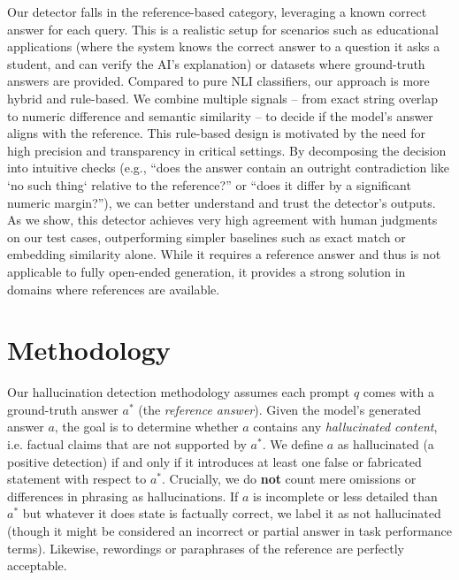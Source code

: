 \documentclass{article}
\begin{document}
Our detector falls in the reference-based category, leveraging a known correct answer for each query. This is a realistic setup for scenarios such as educational applications (where the system knows the correct answer to a question it asks a student, and can verify the AI's explanation) or datasets where ground-truth answers are provided. Compared to pure NLI classifiers, our approach is more hybrid and rule-based. We combine multiple signals -- from exact string overlap to numeric difference and semantic similarity -- to decide if the model's answer aligns with the reference. This rule-based design is motivated by the need for high precision and transparency in critical settings. By decomposing the decision into intuitive checks (e.g., “does the answer contain an outright contradiction like `no such thing` relative to the reference?” or “does it differ by a significant numeric margin?”), we can better understand and trust the detector's outputs. As we show, this detector achieves very high agreement with human judgments on our test cases, outperforming simpler baselines such as exact match or embedding similarity alone. While it requires a reference answer and thus is not applicable to fully open-ended generation, it provides a strong solution in domains where references are available.

\section{Methodology}\label{sec:methodology}
Our hallucination detection methodology assumes each prompt $q$ comes with a ground-truth answer $a^*$ (the \emph{reference answer}). Given the model’s generated answer $a$, the goal is to determine whether $a$ contains any \emph{hallucinated content}, i.e. factual claims that are not supported by $a^*$. We define $a$ as hallucinated (a positive detection) if and only if it introduces at least one false or fabricated statement with respect to $a^*$. Crucially, we do \textbf{not} count mere omissions or differences in phrasing as hallucinations. If $a$ is incomplete or less detailed than $a^*$ but whatever it does state is factually correct, we label it as not hallucinated (though it might be considered an incorrect or partial answer in task performance terms). Likewise, rewordings or paraphrases of the reference are perfectly acceptable.
\end{document}
